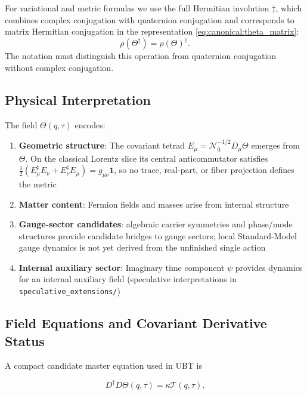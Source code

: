 For variational and metric formulas we use the full Hermitian involution
$\ddagger$, which combines complex conjugation with quaternion conjugation and
corresponds to matrix Hermitian conjugation in the representation
\eqref{eq:canonical:theta_matrix}:
\begin{equation}
  \rho(\Theta^\ddagger)=\rho(\Theta)^\dagger.
\end{equation}
The notation must distinguish this operation from quaternion conjugation without
complex conjugation.

\subsection{Physical Interpretation}

The field $\Theta(q,\tau)$ encodes:

\begin{enumerate}
    \item \textbf{Geometric structure}: The covariant tetrad $E_\mu=\mathcal N_0^{-1/2}D_\mu\Theta$ emerges from $\Theta$.  On the classical Lorentz slice its central anticommutator satisfies $\tfrac12(E_\mu^\sharp E_\nu+E_\nu^\sharp E_\mu)=g_{\mu\nu}\mathbf1$, so no trace, real-part, or fiber projection defines the metric
    
    \item \textbf{Matter content}: Fermion fields and masses arise from internal structure
    
    \item \textbf{Gauge-sector candidates}: algebraic carrier symmetries and phase/mode structures provide candidate bridges to gauge sectors; local Standard-Model gauge dynamics is not yet derived from the unfinished single action
    
    \item \textbf{Internal auxiliary sector}: Imaginary time component $\psi$ provides dynamics for an internal auxiliary field (speculative interpretations in \texttt{speculative\_extensions/})
\end{enumerate}

\subsection{Field Equations and Covariant Derivative Status}

A compact candidate master equation used in UBT is

\begin{equation}
\label{eq:canonical:theta_equation}
D^\dagger D\Theta(q,\tau)=\kappa\mathcal T(q,\tau).
\end{equation}

